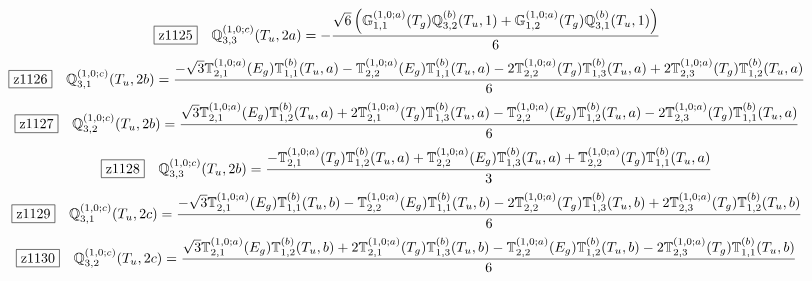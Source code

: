 \documentclass[fleqn,10pt,landscape]{jsarticle}
\begin{document}
\begin{dmath*}
\hspace*{3mm}\fbox{z1125}\quad \mathbb{Q}_{3,3}^{(1,0;c)}(T_{u},2a)=- \frac{\sqrt{6} \left(\mathbb{G}_{1,1}^{(1,0;a)}(T_{g}) \mathbb{Q}_{3,2}^{(b)}(T_{u},1) + \mathbb{G}_{1,2}^{(1,0;a)}(T_{g}) \mathbb{Q}_{3,1}^{(b)}(T_{u},1)\right)}{6}
\end{dmath*}
\begin{dmath*}
\hspace*{3mm}\fbox{z1126}\quad \mathbb{Q}_{3,1}^{(1,0;c)}(T_{u},2b)=\frac{- \sqrt{3} \mathbb{T}_{2,1}^{(1,0;a)}(E_{g}) \mathbb{T}_{1,1}^{(b)}(T_{u},a) - \mathbb{T}_{2,2}^{(1,0;a)}(E_{g}) \mathbb{T}_{1,1}^{(b)}(T_{u},a) - 2 \mathbb{T}_{2,2}^{(1,0;a)}(T_{g}) \mathbb{T}_{1,3}^{(b)}(T_{u},a) + 2 \mathbb{T}_{2,3}^{(1,0;a)}(T_{g}) \mathbb{T}_{1,2}^{(b)}(T_{u},a)}{6}
\end{dmath*}
\begin{dmath*}
\hspace*{3mm}\fbox{z1127}\quad \mathbb{Q}_{3,2}^{(1,0;c)}(T_{u},2b)=\frac{\sqrt{3} \mathbb{T}_{2,1}^{(1,0;a)}(E_{g}) \mathbb{T}_{1,2}^{(b)}(T_{u},a) + 2 \mathbb{T}_{2,1}^{(1,0;a)}(T_{g}) \mathbb{T}_{1,3}^{(b)}(T_{u},a) - \mathbb{T}_{2,2}^{(1,0;a)}(E_{g}) \mathbb{T}_{1,2}^{(b)}(T_{u},a) - 2 \mathbb{T}_{2,3}^{(1,0;a)}(T_{g}) \mathbb{T}_{1,1}^{(b)}(T_{u},a)}{6}
\end{dmath*}
\begin{dmath*}
\hspace*{3mm}\fbox{z1128}\quad \mathbb{Q}_{3,3}^{(1,0;c)}(T_{u},2b)=\frac{- \mathbb{T}_{2,1}^{(1,0;a)}(T_{g}) \mathbb{T}_{1,2}^{(b)}(T_{u},a) + \mathbb{T}_{2,2}^{(1,0;a)}(E_{g}) \mathbb{T}_{1,3}^{(b)}(T_{u},a) + \mathbb{T}_{2,2}^{(1,0;a)}(T_{g}) \mathbb{T}_{1,1}^{(b)}(T_{u},a)}{3}
\end{dmath*}
\begin{dmath*}
\hspace*{3mm}\fbox{z1129}\quad \mathbb{Q}_{3,1}^{(1,0;c)}(T_{u},2c)=\frac{- \sqrt{3} \mathbb{T}_{2,1}^{(1,0;a)}(E_{g}) \mathbb{T}_{1,1}^{(b)}(T_{u},b) - \mathbb{T}_{2,2}^{(1,0;a)}(E_{g}) \mathbb{T}_{1,1}^{(b)}(T_{u},b) - 2 \mathbb{T}_{2,2}^{(1,0;a)}(T_{g}) \mathbb{T}_{1,3}^{(b)}(T_{u},b) + 2 \mathbb{T}_{2,3}^{(1,0;a)}(T_{g}) \mathbb{T}_{1,2}^{(b)}(T_{u},b)}{6}
\end{dmath*}
\begin{dmath*}
\hspace*{3mm}\fbox{z1130}\quad \mathbb{Q}_{3,2}^{(1,0;c)}(T_{u},2c)=\frac{\sqrt{3} \mathbb{T}_{2,1}^{(1,0;a)}(E_{g}) \mathbb{T}_{1,2}^{(b)}(T_{u},b) + 2 \mathbb{T}_{2,1}^{(1,0;a)}(T_{g}) \mathbb{T}_{1,3}^{(b)}(T_{u},b) - \mathbb{T}_{2,2}^{(1,0;a)}(E_{g}) \mathbb{T}_{1,2}^{(b)}(T_{u},b) - 2 \mathbb{T}_{2,3}^{(1,0;a)}(T_{g}) \mathbb{T}_{1,1}^{(b)}(T_{u},b)}{6}
\end{dmath*}
\end{document}
